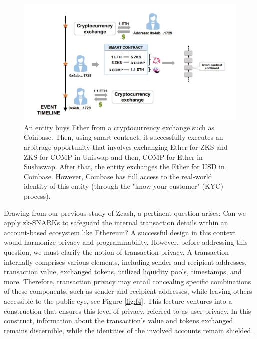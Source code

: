 \documentclass{report}
\begin{document}
\begin{center}
	\begin{figure}
		\centering
		\includegraphics[width=0.8\linewidth]{Fig/F3}
		\caption{An entity buys Ether from a cryptocurrency exchange such as Coinbase. Then, using smart contract, it successfully executes an arbitrage opportunity that involves exchanging Ether for ZKS and ZKS for COMP in Uniswap and then, COMP for Ether in Sushiswap. After that, the entity exchanges the Ether for USD in Coinbase. However, Coinbase has full access to the real-world  identity of this entity (through the "know your customer" (KYC) process).
		}
		\label{fig:f3}
	\end{figure}
\end{center}
Drawing from our previous study of Zcash, a pertinent question arises: Can we apply zk-SNARKs to safeguard the internal transaction details within an account-based ecosystem like Ethereum? A successful design in this context would harmonize privacy and programmability. However, before addressing this question, we must clarify the notion of transaction privacy. A transaction internally comprises various elements, including sender and recipient addresses, transaction value, exchanged tokens, utilized liquidity pools, timestamps, and more. Therefore, transaction privacy may entail concealing specific combinations of these components, such as sender and recipient addresses, while leaving others accessible to the public eye, see Figure \ref{fig:f4}. This lecture ventures into a construction that ensures this level of privacy, referred to as user privacy. In this construct, information about the transaction's value and tokens exchanged remains discernible, while the identities of the involved accounts remain shielded.
\end{document}
